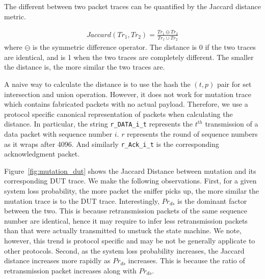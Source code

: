 The different between two packet traces can be quantified by the Jaccard distance
metric.

\begin{align}
  Jaccard(Tr_1, Tr_2) = \frac{Tr_1 \ominus Tr_2}{Tr_1 \cup Tr_2}
\end{align}
where $\ominus$ is the symmetric difference operator.
%
The distance is 0 if the
two traces are identical, and is 1 when the two traces are completely different.
%
The smaller the distance is, the more similar the two traces are.

A naive way to calculate the distance is to use the hash the $(t, p)$ pair for
set intersection and union operation.
%
However, it does not work for mutation
trace which contains fabricated packets with no actual payload.
%
Therefore, we use
a protocol specific canonical representation of packets when calculating the
distance.
%
In particular, the string \texttt{r\_DATA\_i\_t} represents the $t^{th}$
transmission of a data packet with sequence number $i$.
%
$r$ represents the round
of sequence numbers as it wraps after 4096.
%
And similarly \texttt{r\_Ack\_i\_t} is the corresponding acknowledgment packet.

Figure~\ref{fig:mutation_dut} shows the Jaccard Distance between mutation and
its corresponding DUT trace.
%
We make the following observations.
%
First, for a given system loss probability, the more packet the sniffer picks up,
the more similar the mutation trace is to the DUT trace.
%
Interestingly, $Pr_{ds}$ is the dominant factor between the two.
%
This is because retransmission packets of the same sequence number are
identical, hence it may require to infer less retransmission packets than that
were actually transmitted to unstuck the state machine.
%
We note, however, this
trend is protocol specific and may be not be generally applicate to other
protocols.
%
Second, as the system loss probability increases, the Jaccard distance increases
more rapidly as $Pr_{ds}$ increases.
%
This is because the ratio of retransmission
packet increases along with $Pr_{ds}$.


